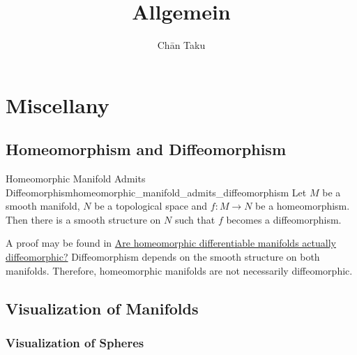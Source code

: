 \documentclass{article}
\title{Allgemein}
\author{Ch\=an Taku}
\begin{document}
\maketitle

\section{}

\section{Miscellany}

\subsection{Homeomorphism and Diffeomorphism}

\begin{theorem}{Homeomorphic Manifold Admits Diffeomorphism}{homeomorphic_manifold_admits_diffeomorphism}
    Let $M$ be a smooth manifold, $N$ be a topological space and $f:M\rightarrow N$ be a homeomorphism.
    Then there is a smooth structure on $N$ such that $f$ becomes a diffeomorphism.
\end{theorem}

A proof may be found in \href{https://math.stackexchange.com/questions/762585/are-homeomorphic-differentiable-manifolds-actually-diffeomorphic}{Are homeomorphic differentiable manifolds actually diffeomorphic?}
Diffeomorphism depends on the smooth structure on both manifolds.
Therefore, homeomorphic manifolds are not necessarily diffeomorphic.

\subsection{Visualization of Manifolds}

\subsubsection{Visualization of Spheres}
\end{document}

